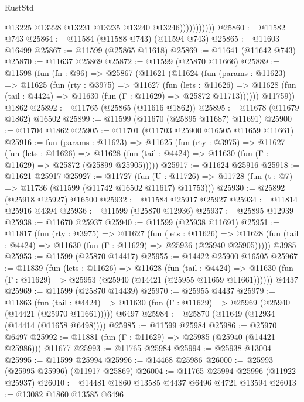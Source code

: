 \begin{lexlean}{RustStd}
\begin{coremodule}
                          @13225
                          @13228
                          @13231
                          @13235
                          @13240
                          @13246)))))))))))
@25860 := @11582 @743
@25864 := @11584 (@11588 @743) (@11594 @743)
@25865 := @11603 @16499
@25867 := @11599 (@25865 @11618)
@25869 := @11641 (@11642 @743)
@25870 := @11637 @25869
@25872 := @11599 (@25870 @11666)
@25889 := @11598
    (fun (fn : @96) =>
    @25867
      (@11621
        (@11624
          (fun (params : @11623) =>
          @11625
            (fun (rty : @3975) =>
            @11627
              (fun (lets : @11626) =>
              @11628 (fun (tail : @4424) => @11630 (fun (Γ : @11629) => @25872 @11713))))))
        @11759))
    @1862
@25892 := @11765 (@25865 (@11616 @1862))
@25895 := @11678 (@11679 @1862) @16502
@25899 := @11599 (@11670 (@25895 @11687) @11691)
@25900 := @11704 @1862
@25905 := @11701 (@11703 @25900 @16505 @11659 @11661)
@25916 := fun (params : @11623) =>
  @11625
    (fun (rty : @3975) =>
    @11627
      (fun (lets : @11626) =>
      @11628 (fun (tail : @4424) => @11630 (fun (Γ : @11629) => @25872 (@25899 @25905)))))
@25917 := @11624 @25916
@25918 := @11621 @25917
@25927 := @11727
    (fun (U : @11726) => @11728 (fun (t : @7) => @11736 (@11599 (@11742 @16502 @11617) @11753)))
@25930 := @25892 (@25918 @25927) @16500
@25932 := @11584 @25917 @25927
@25934 := @11814 @25916 @4394
@25936 := @11599 (@25870 @12936)
@25937 := @25895 @12939
@25938 := @11670 @25937
@25940 := @11599 (@25938 @11691)
@25951 := @11817
    (fun (rty : @3975) =>
    @11627
      (fun (lets : @11626) =>
      @11628 (fun (tail : @4424) => @11630 (fun (Γ : @11629) => @25936 (@25940 @25905)))))
    @3985
@25953 := @11599 (@25870 @14417)
@25955 := @14422 @25900 @16505
@25967 := @11839
    (fun (lets : @11626) =>
    @11628
      (fun (tail : @4424) =>
      @11630 (fun (Γ : @11629) => @25953 (@25940 (@14421 (@25955 @11659 @11661))))))
    @4437
@25969 := @11599 (@25870 @14439)
@25970 := @25955 @4437
@25979 := @11863
    (fun (tail : @4424) => @11630 (fun (Γ : @11629) => @25969 (@25940 (@14421 (@25970 @11661)))))
    @6497
@25984 := @25870 (@11649 (@12934 (@14414 (@11658 @6498))))
@25985 := @11599 @25984
@25986 := @25970 @6497
@25992 := @11881 (fun (Γ : @11629) => @25985 (@25940 (@14421 @25986))) @11677
@25993 := @11765 @25984
@25994 := @25938 @13004
@25995 := @11599 @25994
@25996 := @14468 @25986
@26000 := @25993 (@25995 @25996) (@11917 @25869)
@26004 := @11765 @25994 @25996 (@11922 @25937)
@26010 := @14481 @1860 @13585 @4437 @6496 @4721 @13594
@26013 := @13082 @1860 @13585 @6496

\end{coremodule}
\end{lexlean}
